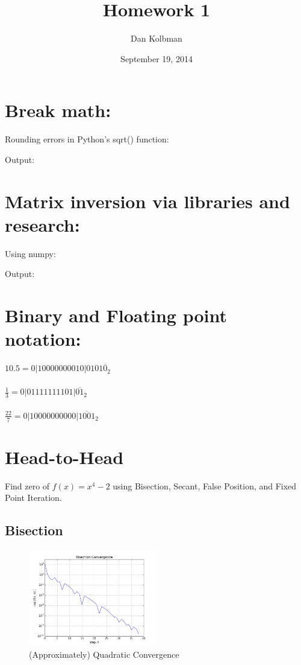 \documentclass[12pt]{article}
\title{Homework 1}
\author{Dan Kolbman}
\date{September 19, 2014}
\begin{document}
  
  \maketitle
 
  \section{Break math:}
  Rounding errors in Python's sqrt() function:
  
  Output:
  
  
  \clearpage

  \section{Matrix inversion via libraries and research:}
  Using numpy:
  
  Output:
  
  
  \section{Binary and Floating point notation:}
  $10.5 =         0|10000000010|0101\overline{0}_2$\\\\
  $\frac{1}{3} =  0|01111111101|\overline{01}_2$\\\\
  $\frac{22}{7} = 0|10000000000|\overline{1001}_2$
  
  \clearpage

  \section{Head-to-Head}
  Find zero of $f(x) = x^4 - 2$ using Bisection, Secant, False Position,
  and Fixed Point Iteration.

  \subsection{Bisection}
  
  \begin{figure}[h!]
    \centering
    \includegraphics[width=0.5\textwidth]{Problem4a.png}
    \caption{(Approximately) Quadratic Convergence}
  \end{figure}
\end{document}
